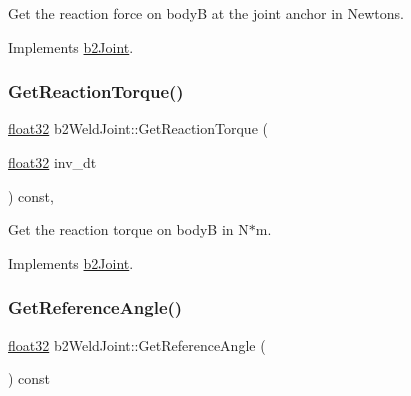 Get the reaction force on bodyB at the joint anchor in Newtons. 



Implements \mbox{\hyperlink{classb2_joint_a7e0eddefb9b69ad050b8ef6425838a74}{b2\+Joint}}.

\mbox{\label{classb2_weld_joint_aa591fa3cb8238eefa2b39cb7422ff07c}} 
\subsubsection{\texorpdfstring{GetReactionTorque()}{GetReactionTorque()}}
{\footnotesize\ttfamily \mbox{\hyperlink{b2_settings_8h_aacdc525d6f7bddb3ae95d5c311bd06a1}{float32}} b2\+Weld\+Joint\+::\+Get\+Reaction\+Torque (\begin{DoxyParamCaption}\item[{\mbox{\hyperlink{b2_settings_8h_aacdc525d6f7bddb3ae95d5c311bd06a1}{float32}}}]{inv\+\_\+dt }\end{DoxyParamCaption}) const\hspace{0.3cm}{\ttfamily [override]}, {\ttfamily [virtual]}}



Get the reaction torque on bodyB in N$\ast$m. 



Implements \mbox{\hyperlink{classb2_joint_ae355e441c2aa842777dc04e24f15ced0}{b2\+Joint}}.

\mbox{\label{classb2_weld_joint_a2be9f207be5b00b775a7576e16d442ef}} 
\subsubsection{\texorpdfstring{GetReferenceAngle()}{GetReferenceAngle()}}
{\footnotesize\ttfamily \mbox{\hyperlink{b2_settings_8h_aacdc525d6f7bddb3ae95d5c311bd06a1}{float32}} b2\+Weld\+Joint\+::\+Get\+Reference\+Angle (\begin{DoxyParamCaption}{ }\end{DoxyParamCaption}) const\hspace{0.3cm}{\ttfamily [inline]}}



